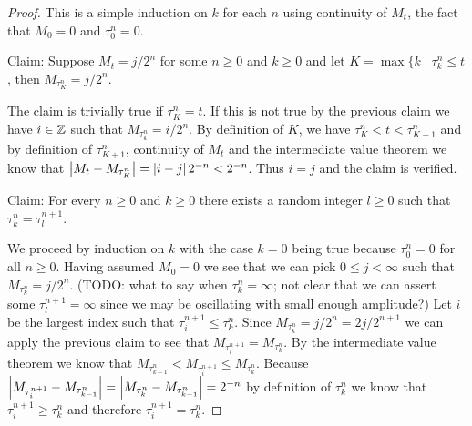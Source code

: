 \begin{proof}
This is a simple induction on $k$ for each $n$ using continuity of $M_t$, the fact that $M_0 = 0$ and $\tau^n_0=0$.

Claim: Suppose $M_t = j/2^n$ for some $n \geq 0$ and $k \geq 0$ and let $K = \max \lbrace k \mid \tau^n_k \leq t$, then $M_{\tau^n_K} = j/2^n$.

The claim is trivially true if $\tau^n_K = t$.  If this is not true by the previous claim we have $i \in \mathbb{Z}$ such that $M_{\tau^n_k} = i/2^n$.  By definition of $K$, we have $\tau^n_K < t < \tau^n_{K+1}$ and by definition of $\tau^n_{K+1}$, continuity of $M_t$ and the intermediate value theorem we know that $\left \vert M_t - M_{\tau^n_K} \right \vert = \left \vert i-j \right \vert2^{-n}< 2^{-n}$.  Thus $i=j$ and the claim is verified.

Claim: For every $n \geq 0$ and $k \geq 0$ there exists a random integer $l \geq 0$ such that $\tau^n_k = \tau^{n+1}_l$.

We proceed by induction on $k$ with the case $k=0$ being true because $\tau^n_0 = 0$ for all $n \geq 0$.  Having assumed $M_0 = 0$ we see that we can pick $0 \leq j < \infty$ such that $M_{\tau^n_k} = j/2^n$. (TODO: what to say when $\tau^n_k = \infty$; not clear that we can assert some $\tau^{n+1}_l=\infty$ since we may be oscillating with small enough amplitude?)  Let $i$ be the largest index such that $\tau^{n+1}_i \leq \tau^n_k$.  Since $M_{\tau^n_k} = j/2^n = 2j/2^{n+1}$ we can apply the previous claim to see that $M_{\tau^{n+1}_i}  = M_{\tau^n_k}$.  By the intermediate value theorem we know that $M_{\tau^n_{k-1}} < M_{\tau^{n+1}_i}  \leq M_{\tau^n_k}$. Because $\left \vert M_{\tau^{n+1}_i} - M_{\tau^n_{k-1}} \right \vert = \left \vert M_{\tau^{n}_k} - M_{\tau^n_{k-1}} \right \vert = 2^{-n}$ by definition of $\tau^n_k$ we know that $\tau^{n+1}_i \geq \tau^n_k$ and therefore $\tau^{n+1}_i = \tau^n_k$.


\end{proof}
